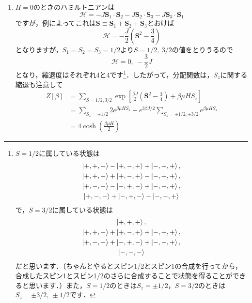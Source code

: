 \documentclass[a4paper,pdflatex,ja=standard]{bxjsarticle}
\begin{document}
\begin{enumerate}
  \item 

  $H=0$のときのハミルトニアンは
  \begin{equation}
    \mathcal{H}
    =
    -J\bm{S}_1\cdot\bm{S}_2
    -J\bm{S}_2\cdot\bm{S}_3
    -J\bm{S}_3\cdot\bm{S}_1
  \end{equation}
  ですが，例によってこれは$\bm{S}\equiv\bm{S}_1+\bm{S}_2+\bm{S}_3$とおけば
  \begin{equation}
    \mathcal{H}
    =
    -\frac{J}{2}
    \left(  
      \bm{S}^2-\frac{3}{4}
    \right)
  \end{equation}
  となりますが，$S_1=S_2=S_3=1/2$より$S=1/2,\ 3/2$の値をとりうるので
  \begin{equation}
    \mathcal{H}
    =
    0,\ -\frac{3}{2}J
  \end{equation}
  となり，縮退度はそれぞれ4と4です\footnote{
    $S=1/2$に属している状態は
    \begin{gather*}   
      \ket{+,+,-}-\ket{+,-,+}+\ket{-,+,+}
      ,\\
      \ket{+,+,-}+\ket{+,-,+}-\ket{-,+,+}
      ,\\
      \ket{+,-,-}-\ket{-,+,-}+\ket{-,-,+}
      ,\\
      \ket{+,-,-}+\ket{-,+,-}-\ket{-,-,+}
    \end{gather*}
    で，$S=3/2$に属している状態は
    \begin{gather*}  
      \ket{+,+,+}
      ,\\
      \ket{+,+,-}+\ket{+,-,+}+\ket{-,+,+}
      ,\\
      \ket{+,-,-}+\ket{-,+,-}+\ket{-,-,+}
      ,\\
      \ket{-,-,-}
    \end{gather*}
    だと思います．（ちゃんとやるとスピン1/2とスピン1の合成を行ってから，合成したスピン1とスピン1/2のさらに合成することで状態を得ることができると思います．）また，$S=1/2$のときは$S_z=\pm 1/2$，$S=3/2$のときは$S_z=\pm3/2,\ \pm1/2$です．
  }．したがって，分配関数は，$S_z$に関する縮退も注意して
  \begin{align}
    Z[\beta]
    &=
    \sum_{S=1/2,3/2}
    \exp
    \left[  
      \frac{\beta J}{2}
      \left(  
        \bm{S}^2-\frac{3}{4}
      \right)
      +
      \beta\mu HS_z
    \right]
    \nonumber
    \\
    &=
    \sum_{S_z=\pm1/2}
    2e^{\beta\mu HS_z}
    +
    e^{3\beta J/2}
    \sum_{S_z=\pm1/2,\pm3/2}
    e^{\beta\mu HS_z}
    \nonumber
    \\
    &=
    4\cosh\left( \frac{\beta\mu H}{2} \right)

\end{align}
\end{enumerate}
\end{document}
